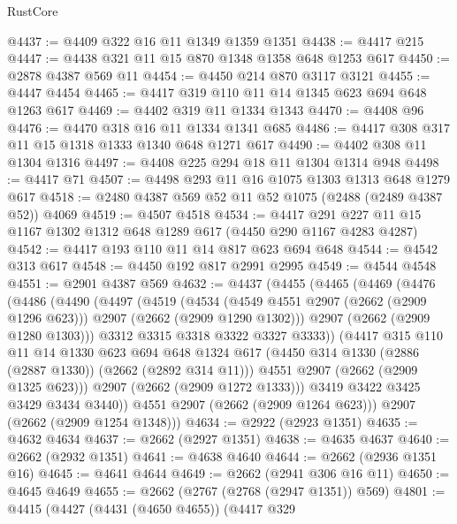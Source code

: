 \begin{lexlean}{RustCore}
\begin{coremodule}
@4437 := @4409 @322 @16 @11 @1349 @1359 @1351
@4438 := @4417 @215
@4447 := @4438 @321 @11 @15 @870 @1348 @1358 @648 @1253 @617
@4450 := @2878 @4387 @569 @11
@4454 := @4450 @214 @870 @3117 @3121
@4455 := @4447 @4454
@4465 := @4417 @319 @110 @11 @14 @1345 @623 @694 @648 @1263 @617
@4469 := @4402 @319 @11 @1334 @1343
@4470 := @4408 @96
@4476 := @4470 @318 @16 @11 @1334 @1341 @685
@4486 := @4417 @308 @317 @11 @15 @1318 @1333 @1340 @648 @1271 @617
@4490 := @4402 @308 @11 @1304 @1316
@4497 := @4408 @225 @294 @18 @11 @1304 @1314 @948
@4498 := @4417 @71
@4507 := @4498 @293 @11 @16 @1075 @1303 @1313 @648 @1279 @617
@4518 := @2480 @4387 @569 @52 @11 @52 @1075 (@2488 (@2489 @4387 @52)) @4069
@4519 := @4507 @4518
@4534 := @4417 @291 @227 @11 @15 @1167 @1302 @1312 @648 @1289 @617 (@4450 @290 @1167 @4283 @4287)
@4542 := @4417 @193 @110 @11 @14 @817 @623 @694 @648
@4544 := @4542 @313 @617
@4548 := @4450 @192 @817 @2991 @2995
@4549 := @4544 @4548
@4551 := @2901 @4387 @569
@4632 := @4437
    (@4455
      (@4465
        (@4469
          (@4476
            (@4486
              (@4490
                (@4497
                  (@4519
                    (@4534
                      (@4549 @4551 @2907 (@2662 (@2909 @1296 @623)))
                      @2907
                      (@2662 (@2909 @1290 @1302)))
                    @2907
                    (@2662 (@2909 @1280 @1303)))
                  @3312
                  @3315
                  @3318
                  @3322
                  @3327
                  @3333))
              (@4417
                @315
                @110
                @11
                @14
                @1330
                @623
                @694
                @648
                @1324
                @617
                (@4450 @314 @1330 (@2886 (@2887 @1330)) (@2662 (@2892 @314 @11)))
                @4551
                @2907
                (@2662 (@2909 @1325 @623)))
              @2907
              (@2662 (@2909 @1272 @1333)))
            @3419
            @3422
            @3425
            @3429
            @3434
            @3440))
        @4551
        @2907
        (@2662 (@2909 @1264 @623)))
      @2907
      (@2662 (@2909 @1254 @1348)))
@4634 := @2922 (@2923 @1351)
@4635 := @4632 @4634
@4637 := @2662 (@2927 @1351)
@4638 := @4635 @4637
@4640 := @2662 (@2932 @1351)
@4641 := @4638 @4640
@4644 := @2662 (@2936 @1351 @16)
@4645 := @4641 @4644
@4649 := @2662 (@2941 @306 @16 @11)
@4650 := @4645 @4649
@4655 := @2662 (@2767 (@2768 (@2947 @1351)) @569)
@4801 := @4415
    (@4427
      (@4431 (@4650 @4655))
      (@4417
        @329

\end{coremodule}
\end{lexlean}
